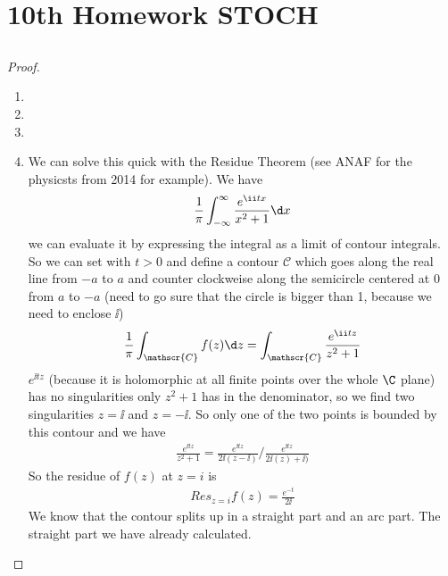 
\section{10th Homework STOCH}
\subsection{}
\begin{proof}
	\begin{enumerate}\
		\item 
		\item 
		\item 
		\item We can solve this quick with the Residue Theorem (see ANAF for the physicsts from 2014 for example). We have
		\begin{align*}
		\frac{1}{\pi}\int_{-\infty}^{\infty} \frac{e^{\ii t x}}{x^2+1} \d x
		\end{align*}
		we can evaluate it by expressing the integral as a limit of contour integrals. So we can set with $t>0$ and define a contour $\mathscr{C}$ which goes along the real line from $-a$ to $a$ and counter clockweise along the semicircle centered at 0 from $a$ to $-a$ (need to go sure that the circle is bigger than 1, because we need to enclose $\ii$)
		\begin{align*}
		\frac{1}{\pi}\int_{\mathscr{C}} f(z) \d z = \int_{\mathscr{C}} \frac{e^{\ii t z}}{z^2+1}
		\end{align*}
		$e^{\ii t z}$ (because it is holomorphic at all finite points over the whole $\C$ plane) has no singularities only $z^2+1$ has in the denominator, so we find two singularities $z=\ii$ and $z = - \ii$. So only one of the two points is bounded by this contour and we have
		\begin{align*}
		\frac{e^{\ii t z}}{z^2+1} = \frac{e^{\ii t z}}{2 \ii (z- \ii)} / \frac{e^{\ii t z}}{2 \ii (z)+ \ii)}
		\end{align*}
		So the residue of $f(z)$ at $z = i$ is
		\begin{align*}
		Res_{z=i} f(z) = \frac{e^{-t}}{2 \ii}
		\end{align*}
		We know that the contour splits up in a straight part and an arc part. The straight part we have already calculated. %
	\end{enumerate}	
\end{proof}

